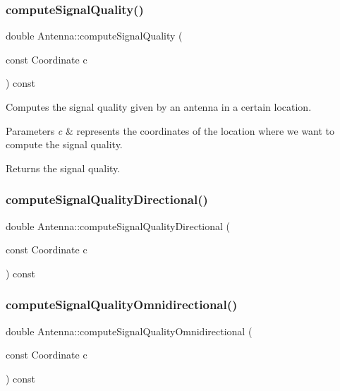 \subsubsection{\texorpdfstring{computeSignalQuality()}{computeSignalQuality()}\hspace{0.1cm}{\footnotesize\ttfamily [2/2]}}
{\footnotesize\ttfamily double Antenna\+::compute\+Signal\+Quality (\begin{DoxyParamCaption}\item[{const Coordinate}]{c }\end{DoxyParamCaption}) const}

Computes the signal quality given by an antenna in a certain location. 
\begin{DoxyParams}{Parameters}
{\em c} & represents the coordinates of the location where we want to compute the signal quality. \\
\hline
\end{DoxyParams}
\begin{DoxyReturn}{Returns}
the signal quality. 
\end{DoxyReturn}
\mbox{\label{class_antenna_a0bba3b0a586d5dc36397c2b9887cd42b}} 
\subsubsection{\texorpdfstring{computeSignalQualityDirectional()}{computeSignalQualityDirectional()}}
{\footnotesize\ttfamily double Antenna\+::compute\+Signal\+Quality\+Directional (\begin{DoxyParamCaption}\item[{const Coordinate}]{c }\end{DoxyParamCaption}) const\hspace{0.3cm}{\ttfamily [private]}}

\mbox{\label{class_antenna_a036e212fda08a9fc5215732378fc4fbd}} 
\subsubsection{\texorpdfstring{computeSignalQualityOmnidirectional()}{computeSignalQualityOmnidirectional()}}
{\footnotesize\ttfamily double Antenna\+::compute\+Signal\+Quality\+Omnidirectional (\begin{DoxyParamCaption}\item[{const Coordinate}]{c }\end{DoxyParamCaption}) const\hspace{0.3cm}{\ttfamily [private]}}

